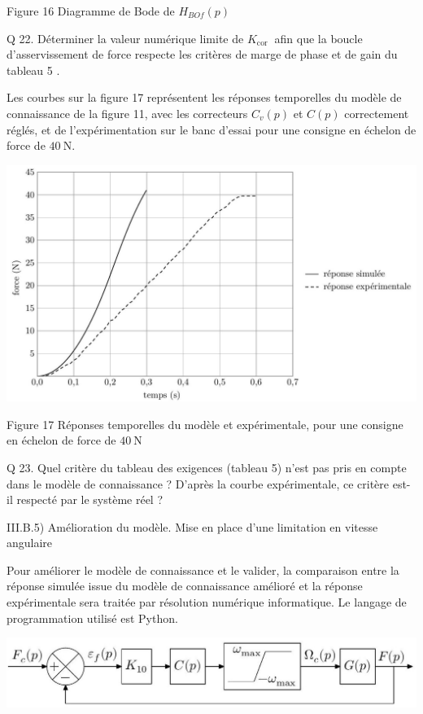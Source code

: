 \documentclass[10pt]{article}
\begin{document}
Figure 16 Diagramme de Bode de $H_{B O f}(p)$

Q 22. Déterminer la valeur numérique limite de $K_{\text {cor }}$ afin que la boucle d'asservissement de force respecte les critères de marge de phase et de gain du tableau 5 .

Les courbes sur la figure 17 représentent les réponses temporelles du modèle de connaissance de la figure 11, avec les correcteurs $C_{v}(p)$ et $C(p)$ correctement réglés, et de l'expérimentation sur le banc d'essai pour une consigne en échelon de force de $40 \mathrm{~N}$.

\begin{center}
\includegraphics[max width=\textwidth]{2024_03_20_0c3cf888f6e04b1986bcg-12}
\end{center}

Figure 17 Réponses temporelles du modèle et expérimentale, pour une consigne en échelon de force de $40 \mathrm{~N}$

Q 23. Quel critère du tableau des exigences (tableau 5) n'est pas pris en compte dans le modèle de connaissance ? D'après la courbe expérimentale, ce critère est-il respecté par le système réel ?

III.B.5) Amélioration du modèle. Mise en place d'une limitation en vitesse angulaire

Pour améliorer le modèle de connaissance et le valider, la comparaison entre la réponse simulée issue du modèle de connaissance amélioré et la réponse expérimentale sera traitée par résolution numérique informatique. Le langage de programmation utilisé est Python.

\begin{center}
\includegraphics[max width=\textwidth]{2024_03_20_0c3cf888f6e04b1986bcg-13}
\end{center}
\end{document}
